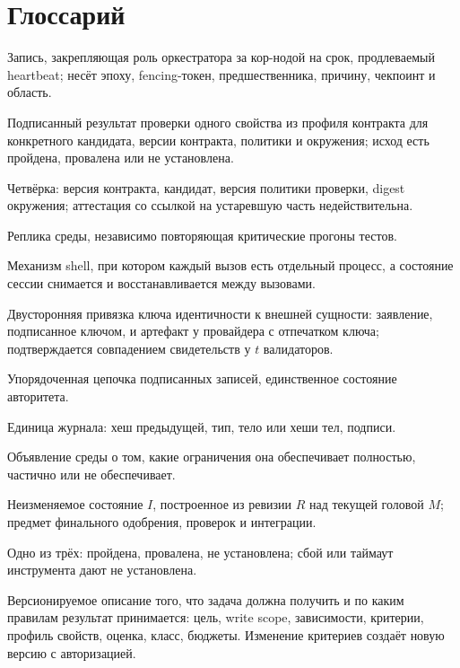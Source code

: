 \chapter{Глоссарий}

\begin{description}[leftmargin=0pt,labelindent=0pt,itemsep=3pt,font=\sffamily\bfseries]
\item[Аренда] Запись, закрепляющая роль оркестратора за кор-нодой на срок, продлеваемый heartbeat; несёт эпоху, fencing-токен, предшественника, причину, чекпоинт и область.
\item[Аттестация] Подписанный результат проверки одного свойства из профиля контракта для конкретного кандидата, версии контракта, политики и окружения; исход есть пройдена, провалена или не установлена.
\item[Адрес аттестации] Четвёрка: версия контракта, кандидат, версия политики проверки, digest окружения; аттестация со ссылкой на устаревшую часть недействительна.
\item[Верификатор] Реплика среды, независимо повторяющая критические прогоны тестов.
\item[Восстановленная сессия] Механизм shell, при котором каждый вызов есть отдельный процесс, а состояние сессии снимается и восстанавливается между вызовами.
\item[Доказательство идентичности] Двусторонняя привязка ключа идентичности к внешней сущности: заявление, подписанное ключом, и артефакт у провайдера с отпечатком ключа; подтверждается совпадением свидетельств у $t$ валидаторов.
\item[Журнал] Упорядоченная цепочка подписанных записей, единственное состояние авторитета.
\item[Запись] Единица журнала: хеш предыдущей, тип, тело или хеши тел, подписи.
\item[Инвентарь] Объявление среды о том, какие ограничения она обеспечивает полностью, частично или не обеспечивает.
\item[Интеграционный кандидат] Неизменяемое состояние $I$, построенное из ревизии $R$ над текущей головой $M$; предмет финального одобрения, проверок и интеграции.
\item[Исход проверки] Одно из трёх: пройдена, провалена, не установлена; сбой или таймаут инструмента дают не установлена.
\item[Контракт задачи] Версионируемое описание того, что задача должна получить и по каким правилам результат принимается: цель, write scope, зависимости, критерии, профиль свойств, оценка, класс, бюджеты. Изменение критериев создаёт новую версию с авторизацией.

\end{description}
